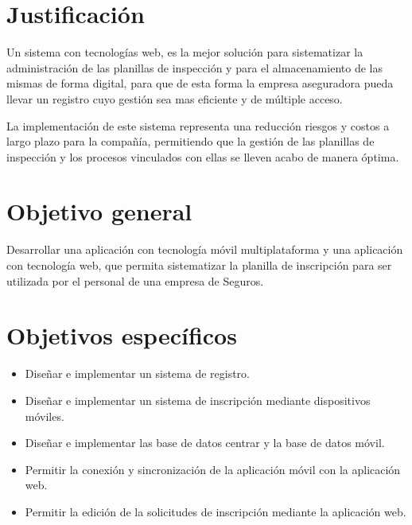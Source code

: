 \setlength{\parskip}{0mm}


\section{Justificación}


Un sistema con tecnologías web, es la mejor solución para sistematizar la administración de las planillas de inspección y para el almacenamiento de las mismas de forma digital, para que de esta forma la empresa aseguradora pueda llevar un registro cuyo gestión sea mas eficiente y de múltiple acceso.

La implementación de este sistema representa una reducción riesgos y costos a largo plazo para la compañía, permitiendo que la gestión de las planillas de inspección y los procesos vinculados con ellas se lleven acabo de manera óptima.


\section{Objetivo general}

Desarrollar una aplicación con tecnología móvil multiplataforma y una aplicación con tecnología web, que permita sistematizar la planilla de inscripción para ser utilizada por el personal de una empresa de Seguros. 

\section{Objetivos específicos}

\begin{itemize}

	\item Diseñar e implementar un sistema de registro.
	
	\item Diseñar e implementar un sistema de inscripción mediante dispositivos móviles.
	
	\item Diseñar e implementar las base de datos centrar y la base de datos móvil.
	
	\item Permitir la conexión y sincronización de la aplicación móvil con la aplicación web.
	
	\item Permitir la edición de la solicitudes de inscripción mediante la aplicación web.
	
	

\end{itemize}



